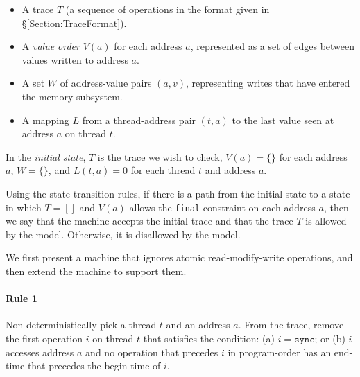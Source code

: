 \documentclass[11pt]{article}
\begin{document}
\begin{itemize}

\item A trace $T$ (a sequence of operations in the format given in
\S\ref{Section:TraceFormat}).

\item A \emph{value order} $V(a)$ for each address $a$, represented as
a set of edges between values written to address $a$.

\item A set $W$ of address-value pairs $(a, v)$, representing writes
that have entered the memory-subsystem.

\item A mapping $L$ from a thread-address pair $(t,a)$ to the last
value seen at address $a$ on thread $t$.

\end{itemize}

In the \emph{initial state}, $T$ is the trace we wish to check, $V(a)
= \{\}$ for each address $a$, $W = \{\}$, and $L(t,a) = 0$ for each
thread $t$ and address $a$.

Using the state-transition rules, if there is a path from the initial
state to a state in which $T = []$ and $V(a)$ allows the
\verb#final# constraint on each address $a$, then we say that the
machine accepts the initial trace and that the trace $T$ is allowed by
the model.  Otherwise, it is disallowed by the model.

We first present a machine that ignores atomic read-modify-write
operations, and then extend the machine to support them.

\paragraph{Rule 1}

Non-deterministically pick a thread $t$ and an address $a$.  From the
trace, remove the first operation $i$ on thread $t$ that satisfies the
condition: (a) $i = \texttt{sync}$; or (b) $i$ accesses address $a$
and no operation that precedes $i$ in program-order has an end-time
that precedes the begin-time of $i$.
\end{document}

